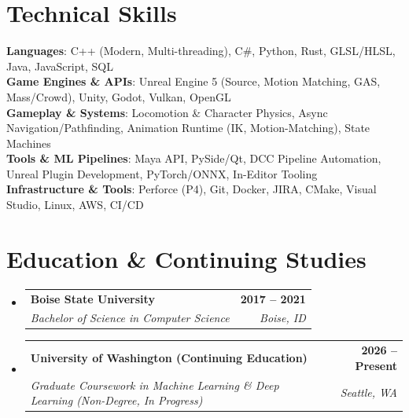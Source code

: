 \documentclass[letterpaper,11pt]{article}
\makeatletter
\newcommand{\resumeSubheading}[4]{
  \vspace{-2pt}\item
    \begin{tabular*}{1.0\textwidth}[t]{l@{\extracolsep{\fill}}r}
      \textbf{#1} & \textbf{\small #2} \\
      \textit{\small#3} & \textit{\small #4} \\
    \end{tabular*}\vspace{-7pt}
}
\newcommand{\resumeSubHeadingListStart}{\begin{itemize}[leftmargin=0.0in, label={}]}
\newcommand{\resumeSubHeadingListEnd}{\end{itemize}}
\makeatother
\begin{document}
\section{Technical Skills}
 \begin{itemize}[leftmargin=0.15in, label={}]
    \small{\item{
     \textbf{Languages}{: C++ (Modern, Multi-threading), C\#, Python, Rust, GLSL/HLSL, Java, JavaScript, SQL} \\
     \textbf{Game Engines \& APIs}{: Unreal Engine 5 (Source, Motion Matching, GAS, Mass/Crowd), Unity, Godot, Vulkan, OpenGL} \\
     \textbf{Gameplay \& Systems}{: Locomotion \& Character Physics, Async Navigation/Pathfinding, Animation Runtime (IK, Motion-Matching), State Machines} \\
     \textbf{Tools \& ML Pipelines}{: Maya API, PySide/Qt, DCC Pipeline Automation, Unreal Plugin Development, PyTorch/ONNX, In-Editor Tooling} \\
     \textbf{Infrastructure \& Tools}{: Perforce (P4), Git, Docker, JIRA, CMake, Visual Studio, Linux, AWS, CI/CD}
    }}
 \end{itemize}
 \vspace{-12pt}

\section{Education \& Continuing Studies}
  \resumeSubHeadingListStart
    \resumeSubheading
      {Boise State University}{2017 -- 2021}
      {Bachelor of Science in Computer Science}{Boise, ID}
    \resumeSubheading
      {University of Washington (Continuing Education)}{2026 -- Present}
      {Graduate Coursework in Machine Learning \& Deep Learning (Non-Degree, In Progress)}{Seattle, WA}
  \resumeSubHeadingListEnd
\end{document}
